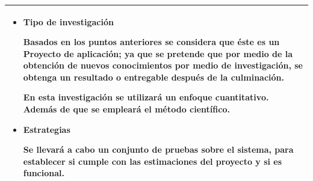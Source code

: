 \documentclass[letter,12pt]{article}
\begin{document}
\begin{center}
\begin{tabular}{|p{15.5cm}|}
\hline
    
    \begin{itemize}
        
        \item Tipo de investigación
        
        Basados en los puntos anteriores se considera que éste es un Proyecto de aplicación; ya que se pretende que por medio de la obtención de nuevos conocimientos por medio de investigación, se obtenga un resultado o entregable después de la culminación. 
    
        En esta investigación se utilizará un enfoque cuantitativo. Además de que se empleará el método científico.
        
        \item Estrategias
        
        Se llevará a cabo un conjunto de pruebas sobre el sistema, para establecer si cumple con las estimaciones del proyecto y si es funcional.
    \end{itemize}\\  

\hline
\end{tabular}
\end{center}

\end{document}
